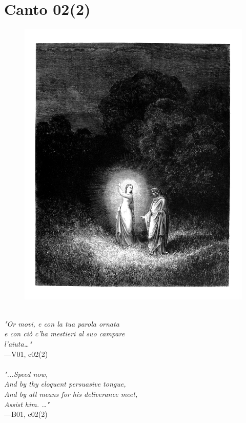 \documentclass[../Dore_vision.tex]{subfiles}
\begin{document}
\newpage

\section{Canto 02(2)}

\begin{figure}[ht]
\centering
\includegraphics[height=\figsize]{illustrations/book_1/V01, c02(2).jpg}
\end{figure}

\begin{center}
\begin{minipage}{0.8\linewidth}
\textit{\\
"Or movi, e con la tua parola ornata\\e con ci\`o c’ha mestieri al suo campare\\l’aiuta…"} \\
—V01, c02(2) \\~\\
\textit{"...Speed now,\\And by thy eloquent persuasive tongue,\\And by all means for his deliverance meet,\\Assist him. …"} \\
—B01, c02(2)
\end{minipage}
\end{center}
\end{document}
